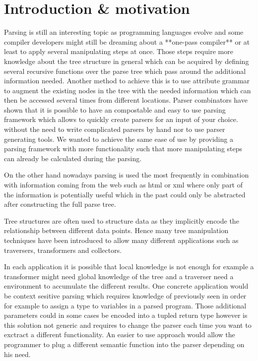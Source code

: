\section{Introduction \& motivation}
Parsing is still an interesting topic as programming languages evolve and some compiler developers might still be dreaming about a **one-pass compiler** or at least to apply several manipulating steps at once. Those steps require more knowledge about the tree structure in general which can be acquired by defining several recursive functions over the parse tree which pass around the additional information needed. Another method to achieve this is to use attribute grammar to augment the existing nodes in the tree with the needed information which can then be accessed several times from different locations.
Parser combinators have shown that it is possible to have an compostable and easy to use parsing framework which allows to quickly create parsers for an input of your choice. without the need to write complicated parsers by hand nor to use parser generating tools. We wanted to achieve the same ease of use by providing a parsing framework with more functionality such that more manipulating steps can already be calculated during the parsing.

On the other hand nowadays parsing is used the most frequently in combination with information coming from the web such as html or xml where only part of the information is potentially useful which in the past could only be abstracted after constructing the full parse tree.

Tree structures are often used to structure data as they implicitly encode the relationship between different data points. Hence many tree manipulation techniques have been introduced to allow many different applications such as traversers, transformers and collectors.

In each application it is possible that local knowledge is not enough for example a transformer might need global knowledge of the tree and a traverser need a environment to accumulate the different results. One concrete application would be context sesitive parsing which requires knowledge of previously seen in order for example to assign a type to variables in a parsed program. Those additional parameters could in some cases be encoded into a tupled return type however is this solution not generic and requires to change the parser each time you want to exctract a different functionality. An easier to use approach would allow the programmer to plug a different semantic function into the parser depending on his need.

